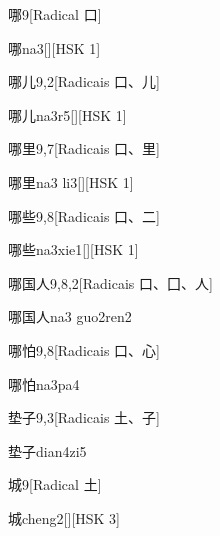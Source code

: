 \begin{entry}{哪}{9}[Radical ⼝]
  \begin{phonetics}{哪}{na3}[][HSK 1]
  \end{phonetics}
\end{entry}

\begin{entry}{哪儿}{9,2}[Radicais ⼝、⼉]
  \begin{phonetics}{哪儿}{na3r5}[][HSK 1]
  \end{phonetics}
\end{entry}

\begin{entry}{哪里}{9,7}[Radicais ⼝、⾥]
  \begin{phonetics}{哪里}{na3 li3}[][HSK 1]
  \end{phonetics}
\end{entry}

\begin{entry}{哪些}{9,8}[Radicais ⼝、⼆]
  \begin{phonetics}{哪些}{na3xie1}[][HSK 1]
  \end{phonetics}
\end{entry}

\begin{entry}{哪国人}{9,8,2}[Radicais ⼝、⼞、⼈]
  \begin{phonetics}{哪国人}{na3 guo2ren2}
  \end{phonetics}
\end{entry}

\begin{entry}{哪怕}{9,8}[Radicais ⼝、⼼]
  \begin{phonetics}{哪怕}{na3pa4}
  \end{phonetics}
\end{entry}

\begin{entry}{垫子}{9,3}[Radicais ⼟、⼦]
  \begin{phonetics}{垫子}{dian4zi5}
  \end{phonetics}
\end{entry}

\begin{entry}{城}{9}[Radical ⼟]
  \begin{phonetics}{城}{cheng2}[][HSK 3]
  \end{phonetics}
\end{entry}

